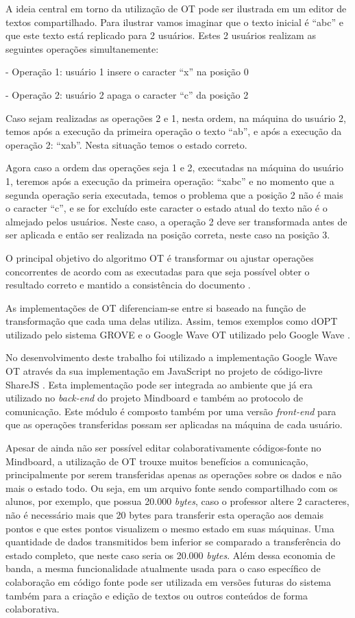 A ideia central em torno da utilização de OT pode ser ilustrada em um editor de textos compartilhado. Para ilustrar vamos imaginar que o texto inicial é ``abc'' e que este texto está replicado para 2 usuários. Estes 2 usuários realizam as seguintes operações simultanemente:

- Operação 1: usuário 1 insere o caracter ``x'' na posição 0

- Operação 2: usuário 2 apaga o caracter ``c'' da posição 2

Caso sejam realizadas as operações 2 e 1, nesta ordem, na máquina do usuário 2, temos após a execução da primeira operação o texto ``ab'', e após a execução da operação 2: ``xab''. Nesta situação temos o estado correto.

Agora caso a ordem das operações seja 1 e 2, executadas na máquina do usuário 1, teremos após a execução da primeira operação: ``xabc'' e no momento que a segunda operação seria executada, temos o problema que a posição 2 não é mais o caracter ``c'', e se for excluído este caracter o estado atual do texto não é o almejado pelos usuários. Neste caso, a operação 2 deve ser transformada antes de ser aplicada e então ser realizada na posição correta, neste caso na posição 3. 

O principal objetivo do algoritmo OT é transformar ou ajustar operações concorrentes de acordo com as executadas para que seja possível obter o resultado correto e mantido a consistência do documento \cite{ot}.

As implementações de OT diferenciam-se entre si baseado na função de transformação que cada uma delas utiliza. Assim, temos exemplos como dOPT utilizado pelo sistema GROVE \cite{ot} e o Google Wave OT utilizado pelo Google Wave \cite{ot2}. 

No desenvolvimento deste trabalho foi utilizado a implementação Google Wave OT através da sua implementação em JavaScript no projeto de código-livre ShareJS \cite{sharejs}. Esta implementação pode ser integrada ao ambiente que já era utilizado no \emph{back-end} do projeto Mindboard e também ao protocolo de comunicação. Este módulo é composto também por uma versão \emph{front-end} para que as operações transferidas possam ser aplicadas na máquina de cada usuário. 

Apesar de ainda não ser possível editar colaborativamente códigos-fonte no Mindboard, a utilização de OT trouxe muitos benefícios a comunicação, principalmente por serem transferidas apenas as operações sobre os dados e não mais o estado todo. Ou seja, em um arquivo fonte sendo compartilhado com os alunos, por exemplo, que possua 20.000 \emph{bytes}, caso o professor altere 2 caracteres, não é necessário mais que 20 bytes para transferir esta operação aos demais pontos e que estes pontos visualizem o mesmo estado em suas máquinas. Uma quantidade de dados transmitidos bem inferior se comparado a transferência do estado completo, que neste caso seria os 20.000 \emph{bytes}. Além dessa economia de banda, a mesma funcionalidade atualmente usada para o caso específico de colaboração em código fonte pode ser utilizada em versões futuras do sistema também para a criação e edição de textos ou outros conteúdos de forma colaborativa.

